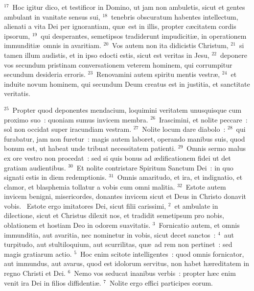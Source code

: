 ${}^{17}$~Hoc igitur dico, et testificor in Domino, ut jam non ambuletis, sicut et gentes ambulant in vanitate sensus sui,
${}^{18}$~tenebris obscuratum habentes intellectum, alienati a vita Dei per ignorantiam, qu\ae\ est in illis, propter c\ae citatem cordis ipsorum,
${}^{19}$~qui desperantes, semetipsos tradiderunt impudiciti\ae , in operationem immunditi\ae\ omnis in avaritiam.
${}^{20}$~Vos autem non ita didicistis Christum,
${}^{21}$~si tamen illum audistis, et in ipso edocti estis, sicut est veritas in Jesu,
${}^{22}$~deponere vos secundum pristinam conversationem veterem hominem, qui corrumpitur secundum desideria erroris.
${}^{23}$~Renovamini autem spiritu mentis vestr\ae ,
${}^{24}$~et induite novum hominem, qui secundum Deum creatus est in justitia, et sanctitate veritatis.


${}^{25}$~Propter quod deponentes mendacium, loquimini veritatem unusquisque cum proximo suo~: quoniam sumus invicem membra.
${}^{26}$~Irascimini, et nolite peccare~: sol non occidat super iracundiam vestram.
${}^{27}$~Nolite locum dare diabolo~:
${}^{28}$~qui furabatur, jam non furetur~: magis autem laboret, operando manibus suis, quod bonum est, ut habeat unde tribuat necessitatem patienti.
${}^{29}$~Omnis sermo malus ex ore vestro non procedat~: sed si quis bonus ad \ae dificationem fidei ut det gratiam audientibus.
${}^{30}$~Et nolite contristare Spiritum Sanctum Dei~: in quo signati estis in diem redemptionis.
${}^{31}$~Omnis amaritudo, et ira, et indignatio, et clamor, et blasphemia tollatur a vobis cum omni malitia.
${}^{32}$~Estote autem invicem benigni, misericordes, donantes invicem sicut et Deus in Christo donavit vobis.
~Estote ergo imitatores Dei, sicut filii carissimi,
${}^{2}$~et ambulate in dilectione, sicut et Christus dilexit nos, et tradidit semetipsum pro nobis, oblationem et hostiam Deo in odorem suavitatis.
${}^{3}$~Fornicatio autem, et omnis immunditia, aut avaritia, nec nominetur in vobis, sicut decet sanctos~:
${}^{4}$~aut turpitudo, aut stultiloquium, aut scurrilitas, qu\ae\ ad rem non pertinet~: sed magis gratiarum actio.
${}^{5}$~Hoc enim scitote intelligentes~: quod omnis fornicator, aut immundus, aut avarus, quod est idolorum servitus, non habet h\ae reditatem in regno Christi et Dei.
${}^{6}$~Nemo vos seducat inanibus verbis~: propter h\ae c enim venit ira Dei in filios diffidenti\ae .
${}^{7}$~Nolite ergo effici participes eorum.


